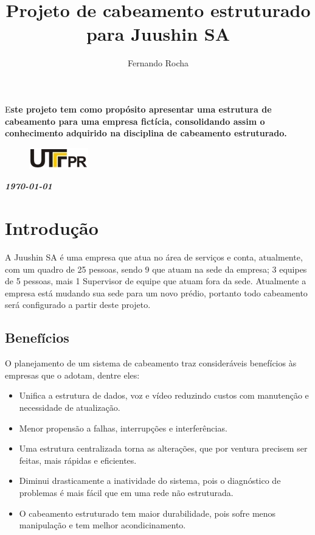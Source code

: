 \documentclass[	DIV=calc,%
paper=a4,%
fontsize=12pt,%
onecolumn]{scrartcl}	 					%
\title{Projeto de cabeamento estruturado para Juushin SA}
\author{Fernando Rocha }  	%
\date{}																				%
\newcommand{\initial}[1]{%
	\lettrine[lines=3,lhang=0.3,nindent=0em]{
		\color{DarkGoldenrod}
		{\textsf{#1}}}{}}
\begin{document}
	\maketitle
	\thispagestyle{fancy} 	
	\thispagestyle{empty}		%
	
	\initial{E}\textbf{ste projeto tem como propósito apresentar uma estrutura de cabeamento para uma empresa fictícia, consolidando assim o conhecimento adquirido na disciplina de cabeamento estruturado.}
	
	
	\begin{figure}
		\centering
		\includegraphics{utfpr}
	\end{figure}
	
	\vspace{2cm}
	\centerline{\textit{\textbf{\today}}}
	
	\clearpage
	\renewcommand*\listfigurename{Lista de figuras}
	\listoffigures
	
	\renewcommand*\listtablename{Lista de tabelas}
	\listoftables
	
	
	
	
	\clearpage
	\renewcommand{\contentsname}{Sumário}
	\tableofcontents
	\clearpage
	
	
	\section{Introdução}
	A Juushin SA é uma empresa que atua no área de serviços e conta, atualmente, com um quadro de 25 pessoas, sendo 9 que atuam na sede da empresa; 3 equipes de 5 pessoas, mais 1 Supervisor de equipe que atuam fora da sede. Atualmente a empresa está mudando sua sede para um novo prédio, portanto todo cabeamento será configurado a partir deste projeto.
	
	\subsection{Benefícios}
	
	O planejamento de um sistema de cabeamento traz consideráveis benefícios às empresas que o adotam, dentre eles:
	\begin{itemize}
		\item Unifica a estrutura de dados, voz e vídeo reduzindo custos com manutenção e necessidade de atualização.
		\item Menor propensão a falhas, interrupções e interferências.
		\item Uma estrutura centralizada torna as alterações, que por ventura precisem ser feitas, mais rápidas e eficientes.
		\item Diminui drasticamente a inatividade do sistema, pois o diagnóstico de problemas é mais fácil que em uma rede não estruturada.
		\item O cabeamento estruturado tem maior durabilidade, pois sofre menos manipulação e tem melhor acondicinamento. 
	\end{itemize}
\end{document}
